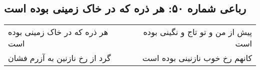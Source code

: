 \begin{center}
\section*{رباعی شماره ۵۰: هر ذره که در خاک زمینی بوده است}
\label{sec:sh050}
\begin{longtable}{l p{0.5cm} r}
هر ذره که در خاک زمینی بوده است
&&
پیش از من و تو تاج و نگینی بوده است
\\
گرد از رخ نازنین به آزرم فشان
&&
کانهم رخ خوب نازنینی بوده است
\\
\end{longtable}
\end{center}
